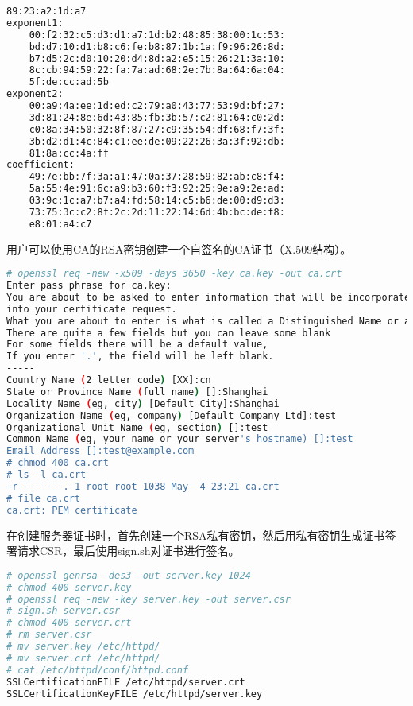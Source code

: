 \begin{lstlisting}[language=bash]
    89:23:a2:1d:a7
exponent1:
    00:f2:32:c5:d3:d1:a7:1d:b2:48:85:38:00:1c:53:
    bd:d7:10:d1:b8:c6:fe:b8:87:1b:1a:f9:96:26:8d:
    b7:d5:2c:d0:10:20:d4:8d:a2:e5:15:26:21:3a:10:
    8c:cb:94:59:22:fa:7a:ad:68:2e:7b:8a:64:6a:04:
    5f:de:cc:ad:5b
exponent2:
    00:a9:4a:ee:1d:ed:c2:79:a0:43:77:53:9d:bf:27:
    3d:81:24:8e:6d:43:85:fb:3b:57:c2:81:64:c0:2d:
    c0:8a:34:50:32:8f:87:27:c9:35:54:df:68:f7:3f:
    3b:d2:d1:4c:84:c1:ee:de:09:22:26:3a:3f:92:db:
    81:8a:cc:4a:ff
coefficient:
    49:7e:bb:7f:3a:a1:47:0a:37:28:59:82:ab:c8:f4:
    5a:55:4e:91:6c:a9:b3:60:f3:92:25:9e:a9:2e:ad:
    03:9c:1c:a7:b7:a4:fd:58:14:c5:b6:de:00:d9:d3:
    73:75:3c:c2:8f:2c:2d:11:22:14:6d:4b:bc:de:f8:
    e8:01:a4:c7
\end{lstlisting}

用户可以使用CA的RSA密钥创建一个自签名的CA证书（X.509结构）。



\begin{lstlisting}[language=bash]
# openssl req -new -x509 -days 3650 -key ca.key -out ca.crt
Enter pass phrase for ca.key:
You are about to be asked to enter information that will be incorporated
into your certificate request.
What you are about to enter is what is called a Distinguished Name or a DN.
There are quite a few fields but you can leave some blank
For some fields there will be a default value,
If you enter '.', the field will be left blank.
-----
Country Name (2 letter code) [XX]:cn  
State or Province Name (full name) []:Shanghai
Locality Name (eg, city) [Default City]:Shanghai
Organization Name (eg, company) [Default Company Ltd]:test
Organizational Unit Name (eg, section) []:test
Common Name (eg, your name or your server's hostname) []:test
Email Address []:test@example.com
# chmod 400 ca.crt
# ls -l ca.crt
-r--------. 1 root root 1038 May  4 23:21 ca.crt
# file ca.crt
ca.crt: PEM certificate
\end{lstlisting}


在创建服务器证书时，首先创建一个RSA私有密钥，然后用私有密钥生成证书签署请求CSR，最后使用sign.sh对证书进行签名。


\begin{lstlisting}[language=bash]
# openssl genrsa -des3 -out server.key 1024
# chmod 400 server.key
# openssl req -new -key server.key -out server.csr
# sign.sh server.csr
# chmod 400 server.crt
# rm server.csr
# mv server.key /etc/httpd/
# mv server.crt /etc/httpd/
# cat /etc/httpd/conf/httpd.conf
SSLCertificationFILE /etc/httpd/server.crt
SSLCertificationKeyFILE /etc/httpd/server.key
\end{lstlisting}


